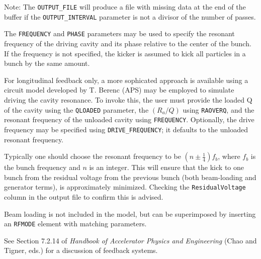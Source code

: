 Note: The \verb|OUTPUT_FILE| will produce a file with missing data at the end of
the buffer if the \verb|OUTPUT_INTERVAL| parameter is not a divisor of the number of passes.

The \verb|FREQUENCY| and \verb|PHASE| parameters may be used to specify the resonant frequency of 
the driving cavity and its phase relative to the center of the bunch.
If the frequency is not specified, the kicker is assumed to kick all particles in a bunch by the
same amount.

For longitudinal feedback only, a more sophicated approach is available using a
circuit model developed by T. Berenc (APS) may be employed to simulate driving the cavity resonance.
To invoke this, the user must provide the loaded Q of the cavity using the \verb|QLOADED| parameter,
the $(R_a/Q)$ using \verb|RAOVERQ|, and the resonant frequency of the unloaded 
cavity using \verb|FREQUENCY|. Optionally, the drive frequency may be specified using
\verb|DRIVE_FREQUENCY|; it defaults to the unloaded resonant frequency.

Typically one should choose the resonant frequency to be $(n\pm \frac{1}{4})f_b$, where
$f_b$ is the bunch frequency and $n$ is an integer.
This will ensure that the kick to one bunch from the residual voltage from the previous
bunch (both beam-loading and generator terms), is approximately minimized.
Checking the \verb|ResidualVoltage| column in the output file to confirm this is advised.

Beam loading is not included in the model, but can be superimposed by inserting an \verb|RFMODE| element
with matching parameters.


See Section 7.2.14 of {\em Handbook of Accelerator Physics and Engineering}
(Chao and Tigner, eds.) for a discussion of feedback systems.
